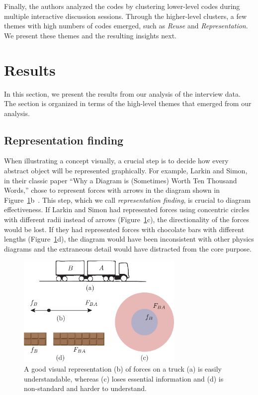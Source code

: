 Finally, the authors analyzed the codes by clustering lower-level codes during multiple interactive discussion sessions. Through the higher-level clusters, a few themes with high numbers of codes emerged, such as \emph{Reuse} and \emph{Representation}. We present these themes and the resulting insights next.

\section{Results}
\label{sec:interview-results}



In this section, we present the results from our analysis of the interview data. The section is organized in terms of the high-level themes that emerged from our analysis.

\subsection{Representation finding}

When illustrating a concept visually, a crucial step is to decide how every abstract object will be represented graphically. For example, Larkin and Simon, in their classic paper ``Why a Diagram is (Sometimes) Worth Ten Thousand Words,'' chose to represent forces with arrows in the diagram shown in Figure~\ref{fig:forcediagram}b~\cite{whyDiagramWorth}. This step, which we call \textit{representation finding}, is crucial to diagram effectiveness. If Larkin and Simon had represented forces using concentric circles with different radii instead of arrows (Figure~\ref{fig:forcediagram}c), the directionality of the forces would be lost. If they had represented forces with chocolate bars with different lengths (Figure~\ref{fig:forcediagram}d), the diagram would have been inconsistent with other physics diagrams and the extraneous detail would have distracted from the core purpose. 

\begin{figure}
    \centering
    \includegraphics[width=8cm]{assets/interviews/larkin-simon-labeled.pdf}
    \caption{A good visual representation (b) of forces on a truck (a) is easily understandable, whereas (c) loses essential information and (d) is non-standard and harder to understand.}
    \label{fig:forcediagram}
\end{figure}

